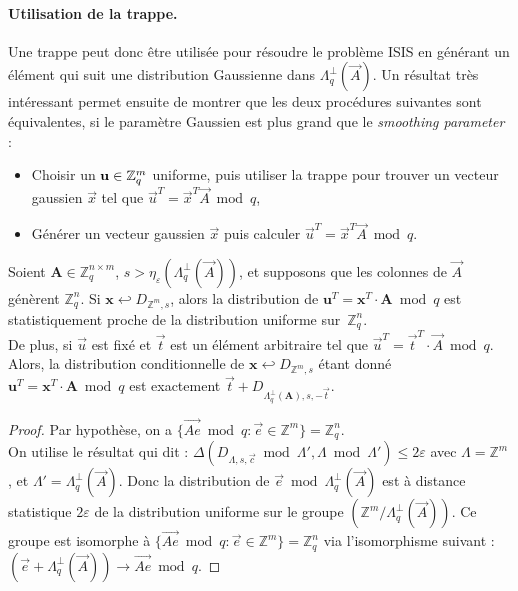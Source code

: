 \paragraph{Utilisation de la trappe.}
Une trappe peut donc être utilisée pour résoudre le problème ISIS en générant un élément qui suit une distribution Gaussienne dans $\Lambda_q^{\perp}(\vec{A})$. Un résultat très intéressant permet ensuite de montrer que les deux procédures suivantes sont équivalentes, si le paramètre Gaussien est plus grand que le \emph{smoothing parameter} :
\begin{itemize}
\item Choisir un $\mathbf{u} \in \mathbb{Z}_q^m$ uniforme, puis utiliser la trappe pour trouver un vecteur gaussien $\vec{x}$ tel que $\vec{u}^T = \vec{x}^T \vec{A} \bmod q$,
\item Générer un vecteur gaussien $\vec{x}$ puis calculer $\vec{u}^T = \vec{x}^T \vec{A} \bmod q$.
\end{itemize}

\begin{lemma}
Soient $\mathbf{A} \in \mathbb{Z}_q^{n \times m}$, $s > \eta_{\varepsilon}(\Lambda_q^{\perp}(\vec{A}))$, et supposons que les colonnes de $\vec{A}$ génèrent $\mathbb{Z}_q^n$. 
Si $\mathbf{x} \hookleftarrow D_{\mathbb{Z}^m, s}$, alors la distribution de $\mathbf{u}^T = \mathbf{x }^T \cdot \mathbf{A}  \bmod q$ est statistiquement proche de la distribution uniforme sur~$\mathbb{Z}_q^n$. \\
De plus, si $\vec{u}$ est fixé et $\vec{t}$ est un élément arbitraire tel que $\vec{u}^T = \vec{t}^T \cdot \vec{A} \bmod q$. Alors, la distribution conditionnelle de $\mathbf{x} \hookleftarrow D_{\mathbb{Z}^m, s}$ étant donné $\mathbf{u}^T = \mathbf{x }^T \cdot \mathbf{A}  \bmod q$ est exactement $\vec{t} + D_{\Lambda_{q}^{\perp}(\mathbf{A}), s, -\vec{t}}$. 
\end{lemma}


\begin{proof}
Par hypothèse, on a $\{\vec{Ae} \bmod q : \vec{e} \in \mathbb{Z}^m \}= \mathbb{Z}_q^n$. \\
On utilise le résultat qui dit : $ \Delta(D_{\Lambda,s,\vec{c}} \bmod \Lambda', \Lambda \bmod \Lambda') \leq 2 \varepsilon$
avec $\Lambda = \mathbb{Z}^m$, et $\Lambda' = \Lambda_q^{\perp}(\vec{A})$.
Donc la distribution de $\vec{e} \bmod \Lambda_q^{\perp}(\vec{A})$ est à distance statistique $2 \varepsilon$ de la distribution uniforme sur le groupe $(\mathbb{Z}^m / \Lambda_q^{\perp}(\vec{A}) )$.
Ce groupe est isomorphe à $\{\vec{Ae} \bmod q : \vec{e} \in \mathbb{Z}^m \}= \mathbb{Z}_q^n$ via l'isomorphisme suivant : $(\vec{e} + \Lambda_q^{\perp}(\vec{A})) \rightarrow \vec{Ae} \bmod q$.
\end{proof}



